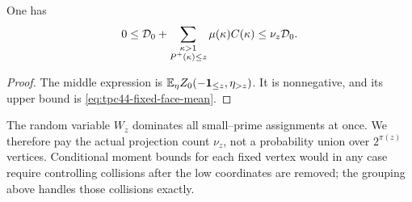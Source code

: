 \begin{corollary}
\label{cor:tpc44-smooth-sector}
One has
\begin{equation}
 0\le
 \mathcal D_0+
 \sum_{\substack{\kappa>1\\P^{+}(\kappa)\le z}}
 \mu(\kappa)C(\kappa)
 \le\nu_z\mathcal D_0.
 \label{eq:tpc44-smooth-sector}
\end{equation}
\end{corollary}

\begin{proof}
The middle expression is
\(
 \mathbb E_\eta Z_0(-\mathbf 1_{\le z},\eta_{>z})
\).
It is nonnegative, and its upper bound is
\eqref{eq:tpc44-fixed-face-mean}.
\end{proof}

\begin{remark}
\label{rem:tpc44-no-union-bound}
The random variable \(W_z\) dominates all small--prime assignments at
once.  We therefore pay the actual projection count \(\nu_z\), not a
probability union over \(2^{\pi(z)}\) vertices.  Conditional moment
bounds for each fixed vertex would in any case require controlling
collisions after the low coordinates are removed; the grouping above
handles those collisions exactly.
\end{remark}
